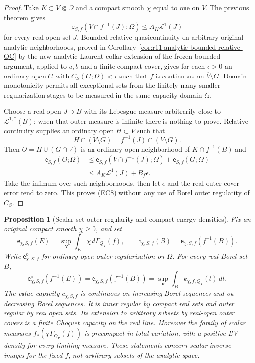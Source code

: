 \documentclass[11pt,a4paper]{article}
\numberwithin{equation}{section}
\newtheorem{proposition}[theorem]{Proposition}
\theoremstyle{definition}
\theoremstyle{remark}
\begin{document}
\begin{proof}
Take $K\subset V\Subset\Omega$ and a compact smooth $\chi$
equal to one on $\overline V$.  The previous theorem gives
\[
 \mathsf e_{S,f}(V\cap f^{-1}(J);\Omega)
                                  \le A_K\mathcal L^1(J)
 \tag{EC9}
\]
for every real open set $J$.  Bounded relative quasicontinuity
on arbitrary original analytic neighborhoods, proved in
Corollary~\ref{cor:r11-analytic-bounded-relative-QC} by the new
analytic Laurent collar extension of the frozen bounded argument,
applied to $a,b$ and a finite compact cover, gives for each
$\epsilon>0$ an ordinary open $G$
with $C_S(G;\Omega)<\epsilon$ such that $f$ is continuous
on $\overline V\setminus G$.  Domain monotonicity permits all
exceptional sets from the finitely many smaller regularization
stages to be measured in the same capacity domain $\Omega$.

Choose a real open $J\supset B$ with its Lebesgue measure
arbitrarily close to $\mathcal L^{1,*}(B)$; when that outer
measure is infinite there is nothing to prove.  Relative
continuity supplies an ordinary open $H\subset V$ such that
\[
 H\cap(V\setminus G)
       = f^{-1}(J)\cap(V\setminus G).
\]
Then $O=H\cup(G\cap V)$ is an ordinary open neighborhood of
$K\cap f^{-1}(B)$ and
\[
 \begin{split}
 \mathsf e_{S,f}(O;\Omega)
 &\le\mathsf e_{S,f}(V\cap f^{-1}(J);\Omega)
                              +\mathsf e_{S,f}(G;\Omega)\\
 &\le A_K\mathcal L^1(J)+B_f\epsilon.
 \end{split}
\]
Take the infimum over such neighborhoods, then let $\epsilon$
and the real outer-cover error tend to zero.  This proves
(EC8) without any use of Borel outer regularity of $C_S$.
\end{proof}

\begin{proposition}[Scalar-set outer regularity and compact energy densities]
\label{prop:r11-scalar-energy-outer-regularity}
Fix an original compact smooth $\chi\geq0$, and set
\[
 \mathsf e_{\chi,S,f}(E)
   =\sup_{\mathbf v}\int_E\chi\,d\Gamma_{Q_{\mathbf v}}(f),
 \qquad
 c_{\chi,S,f}(B)=\mathsf e_{\chi,S,f}(f^{-1}(B)).
 \tag{EC12}
\]
Write $\mathsf e_{\chi,S,f}^{\mathrm o}$ for ordinary-open outer
regularization on $\Omega$.  For every real Borel set $B$,
\[
 \mathsf e_{\chi,S,f}^{\mathrm o}(f^{-1}(B))
       =\mathsf e_{\chi,S,f}(f^{-1}(B))
       =\sup_{\mathbf v}\int_B k_{\chi,f,Q_{\mathbf v}}(t)\,dt.
 \tag{EC13}
\]
The value capacity $c_{\chi,S,f}$ is continuous on increasing
Borel sequences and on decreasing Borel sequences.  It is inner
regular by compact real sets and outer regular by real open sets.
Its extension to arbitrary subsets by real-open outer covers is
a finite Choquet capacity on the real line.
Moreover the family of scalar measures
$f_*(\chi\Gamma_{Q_{\mathbf v}}(f))$ is precompact in total
variation, with a positive BV density for every limiting measure.
These statements concern scalar inverse images for the fixed $f$,
not arbitrary subsets of the analytic space.
\end{proposition}
\end{document}
